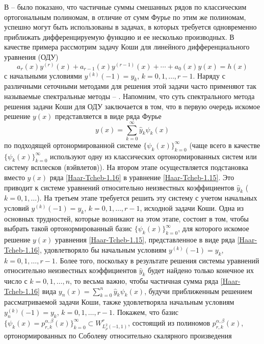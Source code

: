 В \cite{Haar-Tcheb-Shar11} -- \cite{Haar-Tcheb-Shar18}  было показано, что частичные суммы смешанных рядов по классическим ортогональным полиномам, в отличие от сумм Фурье по этим же полиномам, успешно могут быть использованы в задачах, в которых требуется одновременно приближать дифференцируемую функцию и ее несколько производных. В качестве примера рассмотрим задачу Коши  для линейного дифференциального уравнения (ОДУ)
\begin{equation}\label{Haar-Tcheb-1.15}
 a_r(x)y^{(r)}(x)+a_{r-1}(x)y^{(r-1)}(x)+\cdots+a_0(x)y(x)=h(x)
 \end{equation}
с начальными условиями $y^{(k)}(-1)=y_k$, $k=0,1,\ldots,r-1$.  Наряду с различными сеточными методами для решения этой задачи часто применяют так называемые спектральные методы \cite{Haar-Tcheb-Tref1} -- \cite{Haar-Tcheb-MMG2016}. Напомним, что суть спектрального метода решения задачи Коши  для ОДУ  заключается в том, что в первую очередь искомое решение $y(x)$ представляется в виде ряда Фурье
\begin{equation}\label{Haar-Tcheb-1.16}
 y(x)=\sum_{k=0}^\infty \hat y_k\psi_k(x)
 \end{equation}
по подходящей ортонормированной системе $\{\psi_k(x)\}_{k=0}^\infty$ (чаще всего в качестве $\{\psi_k(x)\}_{k=0}^\infty$ используют одну из классических ортонормированных систем или систему  всплесков (вэйвлетов)). На втором этапе осуществляется подстановка вместо $y(x)$ ряда \eqref{Haar-Tcheb-1.16} в уравнение \eqref{Haar-Tcheb-1.15}. Это приводит к системе уравнений относительно неизвестных коэффициентов $\hat y_k$ ($k=0,1,\ldots$). На третьем этапе требуется решить эту систему с учетом начальных условий  $y^{(k)}(-1)=y_k$, $k=0,1,\ldots,r-1$, исходной задачи Коши.
Одна из основных трудностей, которые возникают на этом этапе, состоит в том, чтобы
выбрать такой ортонормированный базис $\{\psi_k(x)\}_{k=0}^\infty$, для которого искомое решение $y(x)$ уравнения \eqref{Haar-Tcheb-1.15}, представленное в виде ряда  \eqref{Haar-Tcheb-1.16}, удовлетворяло бы начальным условиям $y^{(k)}(-1)=y_k$, $k=0,1,\ldots,r-1$. Более того, поскольку в результате решения системы уравнений относительно неизвестных коэффициентов $\hat y_k$  будет найдено только конечное их число с $k=0,1,\ldots, n$, то весьма важно, чтобы частичная сумма ряда \eqref{Haar-Tcheb-1.16}  вида $y_n(x)=\sum_{k=0}^n\hat y_k\psi_k(x)$,
 будучи приближенным решением рассматриваемой задачи Коши, также удовлетворяла начальным условиям $y_n^{(k)}(-1)=y_k$, $k=0,1,\ldots,r-1$. Покажем, что  базис $\{\psi_k(x)=p_{r,k}^{\alpha,\beta}(x)\}_{k=0}^\infty \subset W^r_{L^2_\rho(-1,1)} $, состоящий из полиномов $p_{r,k}^{\alpha,\beta}(x)$, ортонормированных по Соболеву относительно скалярного произведения
